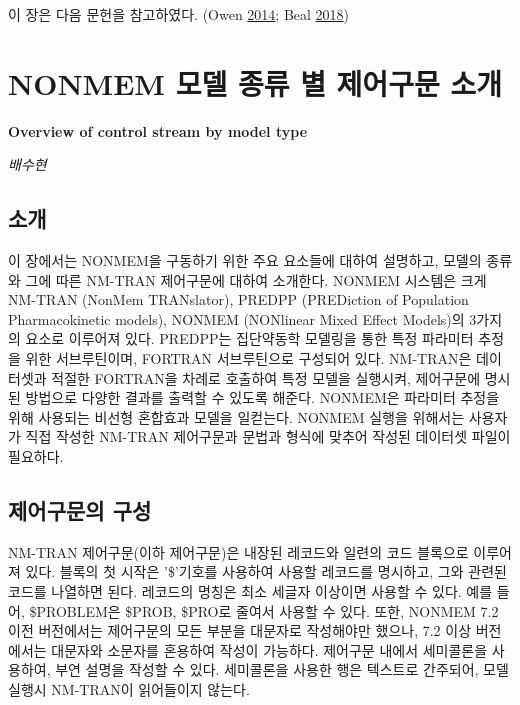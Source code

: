 \documentclass[
  10pt,
  krantz2,
  a4paper]{krantz}
\theoremstyle{definition}
\theoremstyle{definition}
\theoremstyle{definition}
\theoremstyle{remark}
\begin{document}
이 장은 다음 문헌을 참고하였다. (Owen \protect\hyperlink{ref-kelly}{2014}; Beal \protect\hyperlink{ref-nonmem}{2018})

\hypertarget{control-stream}{%
\chapter{NONMEM 모델 종류 별 제어구문 소개}\label{control-stream}}

\textbf{Overview of control stream by model type}

\emph{배수현}

\hypertarget{uxc18cuxac1c-1}{%
\section{소개}\label{uxc18cuxac1c-1}}

이 장에서는 NONMEM을 구동하기 위한 주요 요소들에 대하여 설명하고, 모델의 종류와 그에 따른 NM-TRAN 제어구문에 대하여 소개한다. NONMEM 시스템은 크게 NM-TRAN (NonMem TRANslator), PREDPP (PREDiction of Population Pharmacokinetic models), NONMEM (NONlinear Mixed Effect Models)의 3가지의 요소로 이루어져 있다. PREDPP는 집단약동학 모델링을 통한 특정 파라미터 추정을 위한 서브루틴이며, FORTRAN 서브루틴으로 구성되어 있다. NM-TRAN은 데이터셋과 적절한 FORTRAN을 차례로 호출하여 특정 모델을 실행시켜, 제어구문에 명시된 방법으로 다양한 결과를 출력할 수 있도록 해준다. NONMEM은 파라미터 추정을 위해 사용되는 비선형 혼합효과 모델을 일컫는다. NONMEM 실행을 위해서는 사용자가 직접 작성한 NM-TRAN 제어구문과 문법과 형식에 맞추어 작성된 데이터셋 파일이 필요하다.


\hypertarget{uxc81cuxc5b4uxad6cuxbb38uxc758-uxad6cuxc131}{%
\section{제어구문의 구성}\label{uxc81cuxc5b4uxad6cuxbb38uxc758-uxad6cuxc131}}

NM-TRAN 제어구문(이하 제어구문)은 내장된 레코드와 일련의 코드 블록으로 이루어져 있다. 블록의 첫 시작은 '\$'기호를 사용하여 사용할 레코드를 명시하고, 그와 관련된 코드를 나열하면 된다. 레코드의 명칭은 최소 세글자 이상이면 사용할 수 있다. 예를 들어, \$PROBLEM은 \$PROB, \$PRO로 줄여서 사용할 수 있다. 또한, NONMEM 7.2 이전 버전에서는 제어구문의 모든 부분을 대문자로 작성해야만 했으나, 7.2 이상 버전에서는 대문자와 소문자를 혼용하여 작성이 가능하다. 제어구문 내에서 세미콜론을 사용하여, 부연 설명을 작성할 수 있다. 세미콜론을 사용한 행은 텍스트로 간주되어, 모델 실행시 NM-TRAN이 읽어들이지 않는다.
\end{document}
